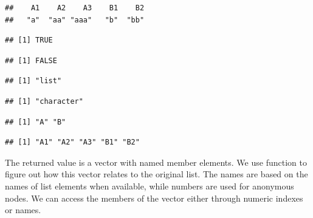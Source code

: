 \documentclass[krantz2]{krantz}\usepackage{knitr}
\begin{document}
\begin{knitrout}\footnotesize
{}\color{fgcolor}\begin{kframe}
\begin{alltt}
 \hlkwb{<-} 
\end{alltt}
\begin{verbatim}
##    A1    A2    A3    B1    B2 
##   "a"  "aa" "aaa"   "b"  "bb"
\end{verbatim}
\begin{alltt}
\end{alltt}
\begin{verbatim}
## [1] TRUE
\end{verbatim}
\begin{alltt}
\end{alltt}
\begin{verbatim}
## [1] FALSE
\end{verbatim}
\begin{alltt}
\end{alltt}
\begin{verbatim}
## [1] "list"
\end{verbatim}
\begin{alltt}
\end{alltt}
\begin{verbatim}
## [1] "character"
\end{verbatim}
\begin{alltt}
\end{alltt}
\begin{verbatim}
## [1] "A" "B"
\end{verbatim}
\begin{alltt}
\end{alltt}
\begin{verbatim}
## [1] "A1" "A2" "A3" "B1" "B2"
\end{verbatim}
\end{kframe}
\end{knitrout}

The returned value is a vector with named member elements. We use function  to figure out how this vector relates to the original list. The names are based on the names of list elements when available, while numbers are used for anonymous nodes. We can access the members of the vector either through numeric indexes or names.
\end{document}
